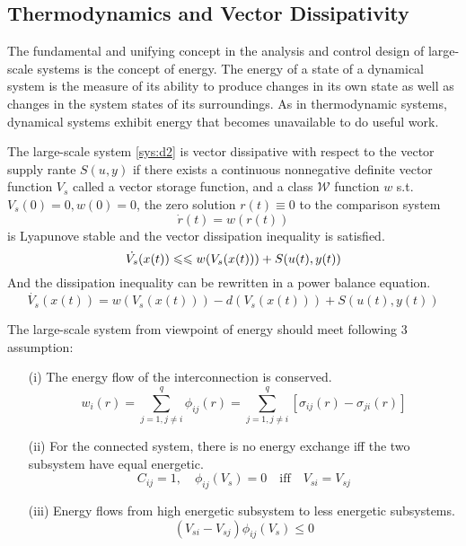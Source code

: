 \documentclass{paper}
\begin{document}
\subsection{Thermodynamics and Vector Dissipativity}
The fundamental and unifying concept in the analysis and control design of large-scale systems is the concept of energy. The energy
of a state of a dynamical system is the measure of its ability to produce changes in its own state as well as changes in the system 
states of its surroundings. As in thermodynamic systems, dynamical systems exhibit energy that becomes unavailable to do useful work. 
\begin{defi}
The large-scale system \ref{sys:d2} is vector dissipative with respect to the vector supply rante $S(u,y)$ if there exists a
continuous nonnegative definite vector function $V_s$ called a vector storage function, and a class $\mathcal{W}$ function $w$ s.t.
$V_s(0)=0,w(0)=0$, the zero solution $r(t)\equiv 0$ to the comparison system 
\begin{equation}
\dot{r}(t)=w(r(t))
\end{equation}
is Lyapunove stable and the vector dissipation inequality is satisfied.
\begin{equation}
\dot{V_s}(x(t))\leqslant\leqslant w(V_s(x(t)))+S(u(t),y(t))
\end{equation}
And the dissipation inequality can be rewritten in a power balance equation.
\begin{equation}\label{eq:large-scale}
\dot{V_s}(x(t))= w(V_s(x(t)))-d(V_s(x(t)))+S(u(t),y(t))
\end{equation}
\end{defi}
\begin{assume}\label{assume:1}
The large-scale system from viewpoint of energy should meet following 3 assumption:
\begin{enumerate}
\item[(i)] The energy flow of the interconnection is conserved.
\begin{equation}
w_i(r)=\sum\limits_{j=1,j\neq i}^{q}\phi_{ij}(r)=\sum\limits_{j=1,j\neq i}^{q}[\sigma_{ij}(r)-\sigma_{ji}(r)]
\end{equation}
\item[(ii)] For the connected system, there is no energy exchange iff the two subsystem have equal energetic.
\begin{equation}
C_{ij}=1,\quad\phi_{ij}(V_s)=0\quad\text{iff}\quad V_{si}=V_{sj}
\end{equation}
\item[(iii)] Energy flows from high energetic subsystem to less energetic subsystems.
\begin{equation}
(V_{si}-V_{sj})\phi_{ij}(V_s)\leqslant 0
\end{equation}
\end{enumerate}
\end{assume}
\end{document}
